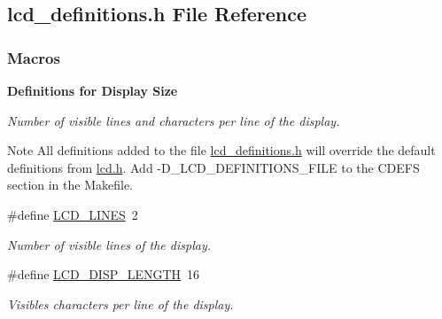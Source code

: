 \hypertarget{a00003}{}\subsection{lcd\+\_\+definitions.\+h File Reference}
\label{a00003}
\subsubsection*{Macros}
\begin{Indent}{\bf Definitions for Display Size}\par
{\em Number of visible lines and characters per line of the display.

\begin{DoxyNote}{Note}
All definitions added to the file \hyperlink{a00003}{lcd\+\_\+definitions.\+h} will override the default definitions from \hyperlink{a00002}{lcd.\+h}. Add -\/\+D\+\_\+\+L\+C\+D\+\_\+\+D\+E\+F\+I\+N\+I\+T\+I\+O\+N\+S\+\_\+\+F\+I\+LE to the C\+D\+E\+FS section in the Makefile. 
\end{DoxyNote}
}\begin{DoxyCompactItemize}
\item 
\#define \hyperlink{a00007_ga01212e90283511562039db786f65ba98}{L\+C\+D\+\_\+\+L\+I\+N\+ES}~2
\begin{DoxyCompactList}\small\item\em Number of visible lines of the display. \end{DoxyCompactList}\item 
\#define \hyperlink{a00007_ga684bb4392e384b7ae7c660d81dacb930}{L\+C\+D\+\_\+\+D\+I\+S\+P\+\_\+\+L\+E\+N\+G\+TH}~16
\begin{DoxyCompactList}\small\item\em Visibles characters per line of the display. \end{DoxyCompactList}\end{DoxyCompactItemize}
\end{Indent}
